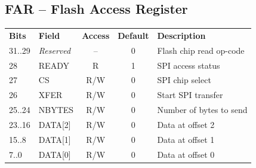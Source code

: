 \documentclass[a4paper,11pt]{article}
\begin{document}
\begin{appendices}
\subsection{FAR -- Flash Access Register}
\label{app:far}

\begin{tabular}{l l c c l}
\textbf{Bits} & \textbf{Field}    & \textbf{Access} & \textbf{Default} & \textbf{Description} \\
31..29        & \textit{Reserved} & --              & 0                & Flash chip read op-code \\
28            & READY             & R               & 1                & SPI access status \\
27            & CS                & R/W             & 0                & SPI chip select \\
26            & XFER              & R/W             & 0                & Start SPI transfer \\
25..24        & NBYTES            & R/W             & 0                & Number of bytes to send \\
23..16        & DATA[2]           & R/W             & 0                & Data at offset 2 \\
15..8         & DATA[1]           & R/W             & 0                & Data at offset 1 \\
7..0          & DATA[0]           & R/W             & 0                & Data at offset 0 \\
\end{tabular}

\vspace*{11pt}

\noindent
{
  \begin{tabular}{l p{}}


\end{tabular}}
\end{appendices}
\end{document}
